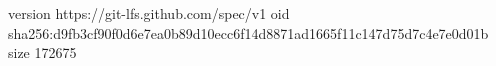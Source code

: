 version https://git-lfs.github.com/spec/v1
oid sha256:d9fb3cf90f0d6e7ea0b89d10ecc6f14d8871ad1665f11c147d75d7c4e7e0d01b
size 172675
